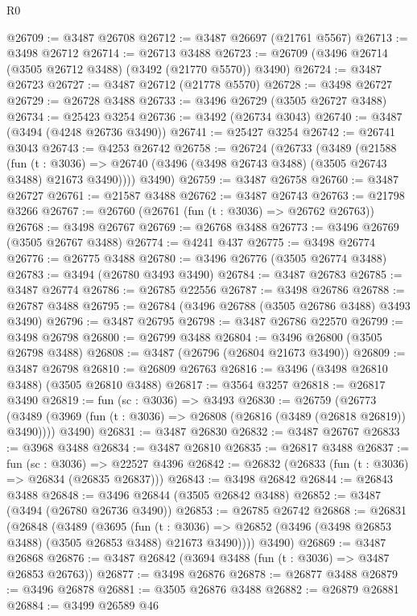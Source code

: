 \begin{lexlean}{R0}
\begin{coremodule}
@26709 := @3487 @26708
@26712 := @3487 @26697 (@21761 @5567)
@26713 := @3498 @26712
@26714 := @26713 @3488
@26723 := @26709 (@3496 @26714 (@3505 @26712 @3488) (@3492 (@21770 @5570)) @3490)
@26724 := @3487 @26723
@26727 := @3487 @26712 (@21778 @5570)
@26728 := @3498 @26727
@26729 := @26728 @3488
@26733 := @3496 @26729 (@3505 @26727 @3488)
@26734 := @25423 @3254
@26736 := @3492 (@26734 @3043)
@26740 := @3487 (@3494 (@4248 @26736 @3490))
@26741 := @25427 @3254
@26742 := @26741 @3043
@26743 := @4253 @26742
@26758 := @26724
    (@26733
      (@3489
        (@21588
          (fun (t : @3036) =>
          @26740 (@3496 (@3498 @26743 @3488) (@3505 @26743 @3488) @21673 @3490))))
      @3490)
@26759 := @3487 @26758
@26760 := @3487 @26727
@26761 := @21587 @3488
@26762 := @3487 @26743
@26763 := @21798 @3266
@26767 := @26760 (@26761 (fun (t : @3036) => @26762 @26763))
@26768 := @3498 @26767
@26769 := @26768 @3488
@26773 := @3496 @26769 (@3505 @26767 @3488)
@26774 := @4241 @437
@26775 := @3498 @26774
@26776 := @26775 @3488
@26780 := @3496 @26776 (@3505 @26774 @3488)
@26783 := @3494 (@26780 @3493 @3490)
@26784 := @3487 @26783
@26785 := @3487 @26774
@26786 := @26785 @22556
@26787 := @3498 @26786
@26788 := @26787 @3488
@26795 := @26784 (@3496 @26788 (@3505 @26786 @3488) @3493 @3490)
@26796 := @3487 @26795
@26798 := @3487 @26786 @22570
@26799 := @3498 @26798
@26800 := @26799 @3488
@26804 := @3496 @26800 (@3505 @26798 @3488)
@26808 := @3487 (@26796 (@26804 @21673 @3490))
@26809 := @3487 @26798
@26810 := @26809 @26763
@26816 := @3496 (@3498 @26810 @3488) (@3505 @26810 @3488)
@26817 := @3564 @3257
@26818 := @26817 @3490
@26819 := fun (sc : @3036) => @3493
@26830 := @26759
    (@26773
      (@3489 (@3969 (fun (t : @3036) => @26808 (@26816 (@3489 (@26818 @26819)) @3490))))
      @3490)
@26831 := @3487 @26830
@26832 := @3487 @26767
@26833 := @3968 @3488
@26834 := @3487 @26810
@26835 := @26817 @3488
@26837 := fun (sc : @3036) => @22527 @4396
@26842 := @26832 (@26833 (fun (t : @3036) => @26834 (@26835 @26837)))
@26843 := @3498 @26842
@26844 := @26843 @3488
@26848 := @3496 @26844 (@3505 @26842 @3488)
@26852 := @3487 (@3494 (@26780 @26736 @3490))
@26853 := @26785 @26742
@26868 := @26831
    (@26848
      (@3489
        (@3695
          (fun (t : @3036) =>
          @26852 (@3496 (@3498 @26853 @3488) (@3505 @26853 @3488) @21673 @3490))))
      @3490)
@26869 := @3487 @26868
@26876 := @3487 @26842 (@3694 @3488 (fun (t : @3036) => @3487 @26853 @26763))
@26877 := @3498 @26876
@26878 := @26877 @3488
@26879 := @3496 @26878
@26881 := @3505 @26876 @3488
@26882 := @26879 @26881
@26884 := @3499 @26589 @46

\end{coremodule}
\end{lexlean}
